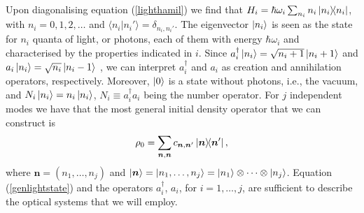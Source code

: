 Upon diagonalising equation (\ref{lighthamil}) we find that $H_i = \hbar \omega_i \sum_{n_i} n_i \ketbra{n_i}$, with $n_i = 0, 1, 2, \dots$ and $\langle n_i | n_i' \rangle = \delta_{n_i,n_i'}$. The eigenvector $\ket{n_i}$ is seen as the state for $n_i$ quanta of light, or photons, each of them with energy $\hbar \omega_i$ and characterised by the properties indicated in $i$. Since $a_i^\dagger \ket{n_i} = \sqrt{n_i + 1}\ket{n_i + 1}$ and $a_i \ket{n_i} = \sqrt{n_i}\ket{n_i - 1}$ \cite{rafal2015}, we can interpret $a_i^\dagger$ and $a_i$ as creation and annihilation operators, respectively. Moreover, $\ket{0}$ is a state without photons, i.e., the vacuum, and $N_i \ket{n_i} = n_i \ket{n_i}$, $N_i \equiv a_i^\dagger a_i$ being the number operator. For $j$ independent modes we have that the most general initial density operator that we can construct is \cite{rafal2015}
\begin{equation}
\rho_0 = \sum_{\boldsymbol{n}, \boldsymbol{n}} c_{\boldsymbol{n}, \boldsymbol{n}'} \ketbra{\boldsymbol{n}}{\boldsymbol{n}'},
\label{genlightstate}
\end{equation}
where $\boldsymbol{n} = (n_1, \dots, n_j)$ and $\ket{\boldsymbol{n}} = \ket{n_1, \dots, n_j} = \ket{n_1}\otimes \cdots \otimes\ket{n_j}$. Equation (\ref{genlightstate}) and the operators $a_i^\dagger$, $a_i$, for $i = 1, \dots, j$, are sufficient to describe the optical systems that we will employ. 

